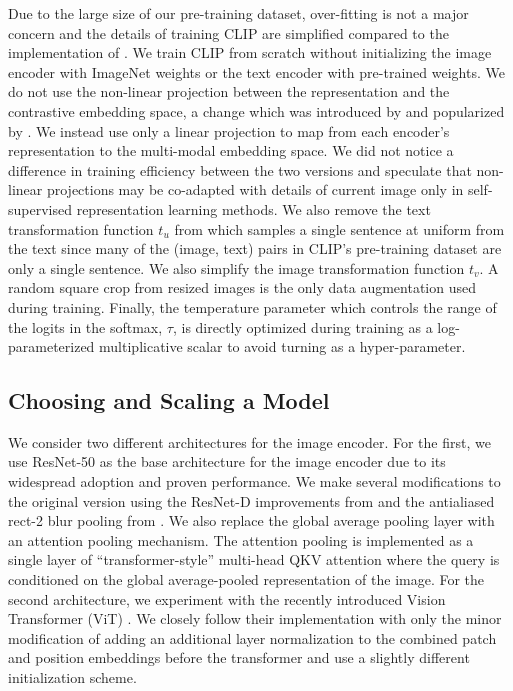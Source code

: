 Due to the large size of our pre-training dataset, over-fitting is not a major concern and the details of training CLIP are simplified compared to the implementation of \citet{zhang2020contrastive}. We train CLIP from scratch without initializing the image encoder with ImageNet weights or the text encoder with pre-trained weights. We do not use the non-linear projection between the representation and the contrastive embedding space, a change which was introduced by \citet{bachman2019learning} and popularized by \citet{chen2020simple}. We instead use only a linear projection to map from each encoder's representation to the multi-modal embedding space. We did not notice a difference in training efficiency between the two versions and speculate that non-linear projections may be co-adapted with details of current image only in self-supervised representation learning methods. We also remove the text transformation function $t_u$ from \citet{zhang2020contrastive} which samples a single sentence at uniform from the text since many of the (image, text) pairs in CLIP's pre-training dataset are only a single sentence. We also simplify the image transformation function $t_v$. A random square crop from resized images is the only data augmentation used during training. Finally, the temperature parameter which controls the range of the logits in the softmax, $\tau$, is directly optimized during training as a log-parameterized multiplicative scalar to avoid turning as a hyper-parameter.

\subsection{Choosing and Scaling a Model}

We consider two different architectures for the image encoder. For the first, we use ResNet-50 \citep{he2016deep} as the base architecture for the image encoder due to its widespread adoption and proven performance. We make several modifications to the original version using the ResNet-D improvements from \citet{he2019bag} and the antialiased rect-2 blur pooling from \citet{zhang2019making}. We also replace the global average pooling layer with an attention pooling mechanism. The attention pooling is implemented as a single layer of ``transformer-style'' multi-head QKV attention where the query is conditioned on the global average-pooled representation of the image. For the second architecture, we experiment with the recently introduced Vision Transformer (ViT) \citep{dosovitskiy2020image}. We closely follow their implementation with only the minor modification of adding an additional layer normalization to the combined patch and position embeddings before the transformer and use a slightly different initialization scheme.

